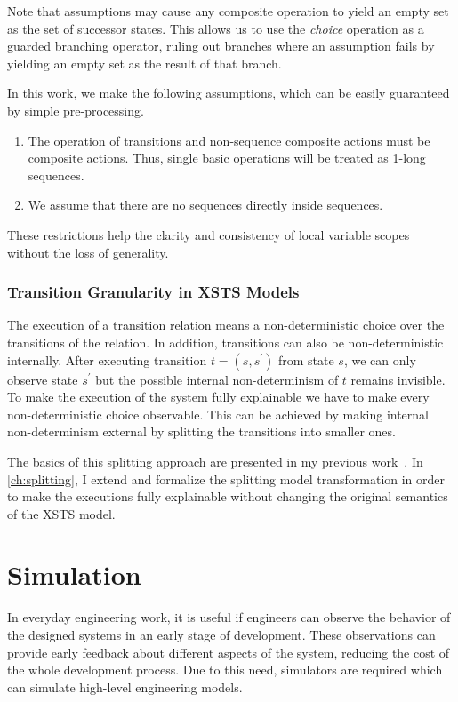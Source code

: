 Note that assumptions may cause any composite operation to yield an empty set as the set of successor states. This allows us to use the \emph{choice} operation as a guarded branching operator, ruling out branches where an assumption fails by yielding an empty set as the result of that branch.

In this work, we make the following assumptions, which can be easily guaranteed by simple pre-processing.
\begin{enumerate}
    \item The operation of transitions and non-sequence composite actions must be composite actions. Thus, single basic operations will be treated as 1-long sequences.
    \item We assume that there are no sequences directly inside sequences.
\end{enumerate}
These restrictions help the clarity and consistency of local variable scopes without the loss of generality.

\subsubsection{Transition Granularity in XSTS Models} \label{ssec:xsts-gran}

The execution of a transition relation means a non-deterministic choice over the transitions of the relation. In addition, transitions can also be non-deterministic internally. After executing transition $t=(s, s^\prime)$ from state $s$, we can only observe state $s^\prime$ but the possible internal non-determinism of $t$ remains invisible. To make the execution of the system fully explainable we have to make every non-deterministic choice observable. This can be achieved by making internal non-determinism external by splitting the transitions into smaller ones.

The basics of this splitting approach are presented in my previous work~\cite{xsts-split}. In \autoref{ch:splitting}, I extend and formalize the splitting model transformation in order to make the executions fully explainable without changing the original semantics of the XSTS model.

\section{Simulation}\label{sec:sim}

In everyday engineering work, it is useful if engineers can observe the behavior of the designed systems in an early stage of development. These observations can provide early feedback about different aspects of the system, reducing the cost of the whole development process. Due to this need, simulators are required which can simulate high-level engineering models.

